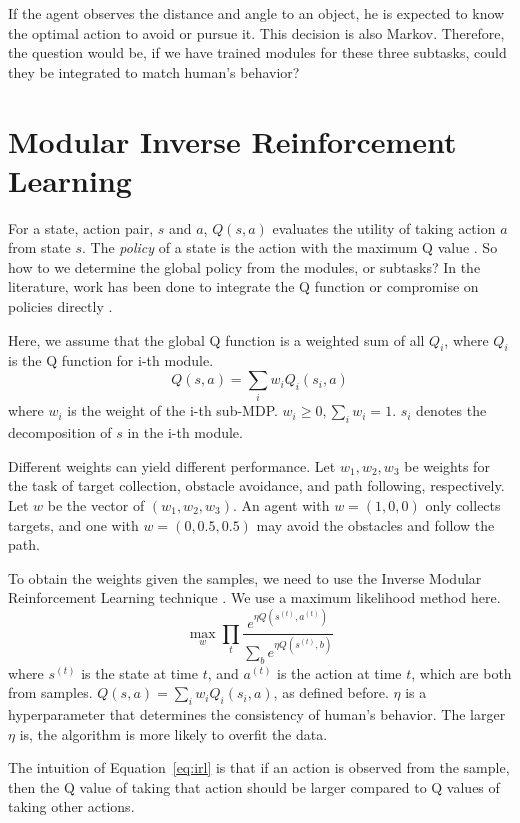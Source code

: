 \documentclass[11pt]{article} %
\begin{document}
If the agent observes the distance and angle to an object, he is expected to
know the optimal action to avoid or pursue it. This decision is also Markov.
Therefore, the question would be, if we have trained modules for these three
subtasks, could they be integrated to match human's behavior?

\section{Modular Inverse Reinforcement Learning}
\label{sec:rl}

For a state, action
pair, $s$ and $a$, $Q(s, a)$ evaluates the utility of taking action $a$ from
state $s$. The {\em policy} of a state is the action with the maximum Q
value \cite{rl}. So how to we determine the global policy from the modules, or
subtasks? In the literature, work has been done to integrate the Q function
\cite{koller1999computing} or compromise on policies directly
\cite{thomas2012motor}.

Here, we assume that the global Q function is a weighted sum of all $Q_i$, where
$Q_i$ is the Q function for i-th module.
$$Q(s, a) = \sum_i w_i Q_i (s_i, a)$$
where $w_i$ is the weight of the i-th sub-MDP. $w_i \geq 0, \sum_i w_i = 1$.
$s_i$ denotes the decomposition of $s$ in the i-th module.

Different weights can yield different performance. Let $w_1, w_2, w_3$ be
weights for the task of target collection, obstacle avoidance, and path
following, respectively. Let $w$ be the vector of $(w_1, w_2, w_3)$. An agent
with $w = (1, 0, 0)$ only collects targets, and one with $w = (0, 0.5, 0.5)$ may
avoid the obstacles and follow the path.

To obtain the weights given the samples, we need to use the Inverse Modular
Reinforcement Learning technique \cite{rothkopf2013modular}. We use a maximum
likelihood method here.
\begin{equation}
\label{eq:irl}
\max_w \prod_t \frac{e^{\eta Q(s^{(t)}, a^{(t)})}}{\sum_b e^{\eta Q(s^{(t)}, b)}}
\end{equation}
where $s^{(t)}$ is the state at time $t$, and $a^{(t)}$ is the action at time
$t$, which are both from samples. $Q(s, a) = \sum_i w_i Q_i(s_i, a)$, as defined
before. $\eta$ is a hyperparameter that determines the consistency of human's
behavior. The larger $\eta$ is, the algorithm is more likely to overfit the data.

The intuition of Equation~\ref{eq:irl} is that if an action is observed from the
sample, then the Q value of taking that action should be larger compared to Q
values of taking other actions.
\end{document}
